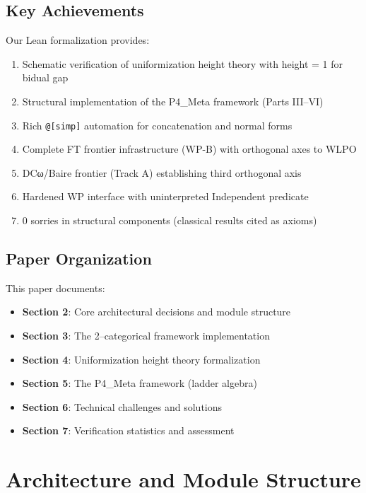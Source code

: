 \documentclass[11pt]{article}
\theoremstyle{definition}
\theoremstyle{remark}
\begin{document}
\subsection{Key Achievements}

Our Lean formalization provides:
\begin{enumerate}
\item Schematic verification of uniformization height theory with height = 1 for bidual gap
\item Structural implementation of the P4\_Meta framework (Parts III--VI)
\item Rich \texttt{@[simp]} automation for concatenation and normal forms
\item Complete FT frontier infrastructure (WP-B) with orthogonal axes to WLPO
\item DCω/Baire frontier (Track A) establishing third orthogonal axis
\item Hardened WP interface with uninterpreted Independent predicate
\item 0 sorries in structural components (classical results cited as axioms)
\end{enumerate}

\subsection{Paper Organization}

This paper documents:
\begin{itemize}
\item \textbf{Section 2}: Core architectural decisions and module structure
\item \textbf{Section 3}: The 2--categorical framework implementation
\item \textbf{Section 4}: Uniformization height theory formalization
\item \textbf{Section 5}: The P4\_Meta framework (ladder algebra)
\item \textbf{Section 6}: Technical challenges and solutions
\item \textbf{Section 7}: Verification statistics and assessment
\end{itemize}

\section{Architecture and Module Structure}
\end{document}
